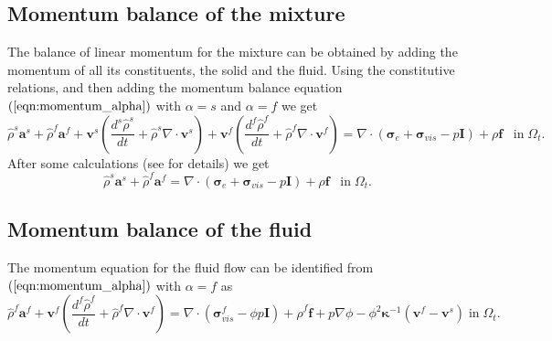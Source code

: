 \subsection{Momentum balance of the mixture}
The balance of linear momentum for the mixture can be obtained by adding the momentum of all its constituents, the solid and the fluid. Using the constitutive relations, and then adding the momentum balance equation $(\ref{eqn:momentum_alpha})$ with $\alpha=s$ and $\alpha=f$ we get
\begin{equation*}
\hat\rho^{s}\boldsymbol{a}^{s}+\hat\rho^{f}\boldsymbol{a}^{f}+  \boldsymbol{v}^{s}\left(  \frac{d^{s}\hat{\rho}^{s}  }{dt}  + \hat{\rho}^{s}  \nabla \cdot \boldsymbol{v}^{s} \right) +  \boldsymbol{v}^{f}\left(  \frac{d^{f}\hat{\rho}^{f}  }{dt}  + \hat{\rho}^{f} \nabla \cdot \boldsymbol{v}^{f} \right)=\nabla \cdot( \boldsymbol{\sigma}_{e}+\boldsymbol{\sigma}_{vis}-p\boldsymbol{I}) + \rho\boldsymbol{f} \;\;\; \mbox{in} \; \Omega_{t}. 
\end{equation*}
After some calculations (see \citet[section 3.2]{chapelle2010poroelastic} for details) we get
\begin{equation}
\hat\rho^{s}\boldsymbol{a}^{s}+\hat\rho^{f}\boldsymbol{a}^{f} =\nabla \cdot( \boldsymbol{\sigma}_{e}+\boldsymbol{\sigma}_{vis}-p\boldsymbol{I}) + \rho\boldsymbol{f} \;\;\; \mbox{in} \; \Omega_{t}. 
\label{mixture_motion_eulerian}
\end{equation}

\subsection{Momentum balance of the fluid}
The momentum equation for the fluid flow can be identified from $(\ref{eqn:momentum_alpha})$ with $\alpha=f$ as 
\begin{equation}
\hat\rho^{f} {\boldsymbol{a}}^{f}+  \boldsymbol{v}^{f}\left(  \frac{d^{f}\hat{\rho}^{f}  }{dt}  + \hat{\rho}^{f}  \nabla \cdot \boldsymbol{v}^{f} \right)=\nabla \cdot( \boldsymbol{\sigma}_{vis}^{f}- \phi p \boldsymbol{I})  + \hat \rho^{f}\boldsymbol{f}  + p \nabla \phi-\phi^{2} \boldsymbol{\kappa}^{-1}(\boldsymbol{v}^{f}-\boldsymbol{v}^{s}) \; \mbox{in} \; \Omega_{t}.
\label{general_darcy}
\end{equation}

